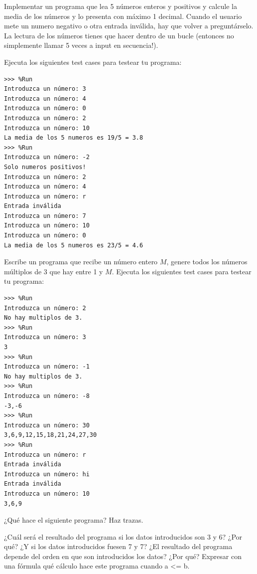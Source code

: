 \begin{ejercicio}
 Implementar un programa que lea 5 números enteros y positivos y calcule la media de los números y lo presenta con máximo 1 decimal. Cuando el usuario mete un numero negativo o otra entrada inválida, hay que volver a preguntárselo. La lectura de los números tienes que hacer dentro de un bucle (entonces no simplemente llamar 5 veces a input en secuencia!). 
 
Ejecuta los siguientes test cases para testear tu programa:\\

\begin{Verbatim}[frame=single, label={\em ejemplo de ejecución}]
>>> %Run 
Introduzca un número: 3
Introduzca un número: 4
Introduzca un número: 0
Introduzca un número: 2
Introduzca un número: 10
La media de los 5 numeros es 19/5 = 3.8
>>> %Run 
Introduzca un número: -2
Solo numeros positivos!
Introduzca un número: 2
Introduzca un número: 4
Introduzca un número: r
Entrada inválida
Introduzca un número: 7
Introduzca un número: 10
Introduzca un número: 0
La media de los 5 numeros es 23/5 = 4.6
\end{Verbatim}

\end{ejercicio}

\begin{ejercicio} 
Escribe un programa que recibe un número entero $M$, genere todos los números múltiplos de 3 que hay entre 1 y $M$. Ejecuta los siguientes test cases para testear tu programa:\\

\begin{Verbatim}[frame=single, label={\em ejemplo de ejecución}]
>>> %Run 
Introduzca un número: 2
No hay multiplos de 3.
>>> %Run 
Introduzca un número: 3
3
>>> %Run 
Introduzca un número: -1
No hay multiplos de 3.
>>> %Run 
Introduzca un número: -8
-3,-6
>>> %Run 
Introduzca un número: 30
3,6,9,12,15,18,21,24,27,30
>>> %Run 
Introduzca un número: r
Entrada inválida
Introduzca un número: hi
Entrada inválida
Introduzca un número: 10
3,6,9
\end{Verbatim}
\end{ejercicio}


\begin{ejercicio}
¿Qué hace el siguiente programa? Haz trazas.


¿Cuál será el resultado del programa si los datos introducidos son 3 y 6? ¿Por qué?
¿Y si los datos introducidos fuesen 7 y 7?
¿El resultado del programa depende del orden en que son introducidos los datos? ¿Por qué?
Expresar con una fórmula qué cálculo hace este programa cuando a <= b.

\end{ejercicio}



